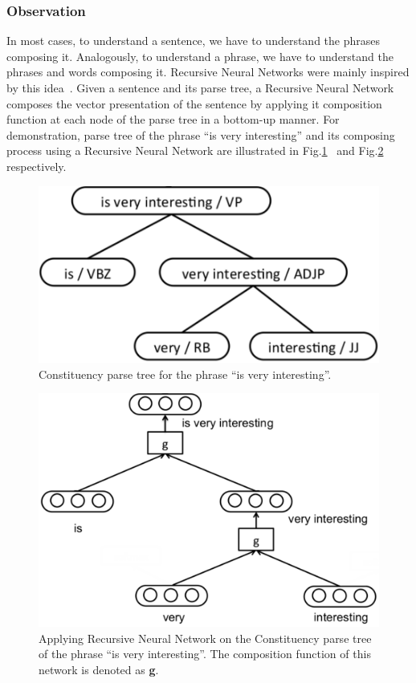 \subsubsection{Observation}
In most cases, to understand a sentence, we have to understand the phrases composing it.
Analogously, to understand a phrase, we have to understand the phrases and words composing it.
Recursive Neural Networks were mainly inspired by this idea~\cite{treeLSTM}.
Given a sentence and its parse tree, a Recursive Neural Network composes the vector presentation of the sentence by applying it composition function at each node of the parse tree in a bottom-up manner.
For demonstration, parse tree of the phrase ``is very interesting'' and its composing process using a Recursive Neural Network are illustrated in Fig.\ref{fig:example-parse}~\cite{tag-embedding-rnn} and Fig.\ref{fig:example-compose} respectively.


\begin{figure}[H]
    \centering
    \includegraphics[scale=0.5]{figure/example-parse}
    \caption[Constituency parse tree for the phrase ``is very interesting'']{Constituency parse tree for the phrase ``is very interesting''.}
    \label{fig:example-parse}
\end{figure}

\begin{figure}[H]
    \centering
    \includegraphics[scale=0.46]{figure/example-compose}
    \caption[Applying Recursive Neural Network on the phrase ``is very interesting'']{Applying Recursive Neural Network on the Constituency parse tree of the phrase ``is very interesting''.
    The composition function of this network is denoted as \textbf{g}.}
    \label{fig:example-compose}
\end{figure}


